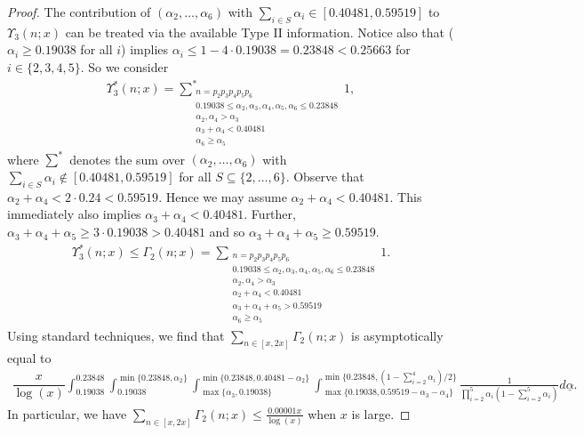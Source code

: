 \documentclass{amsart}
\numberwithin{equation}{section}
\begin{document}
\begin{proof}
\vspace{3mm} The contribution of $(\alpha_2,\dots, \alpha_6)$ with $\sum_{i \in S} \alpha_i \in [0.40481,0.59519]$ to $\Upsilon_3(n;x)$ can be treated via the available Type II information. Notice also that ($\alpha_i \geq 0.19038$ for all $i$)  implies $\alpha_i \leq 1- 4 \cdot 0.19038= 0.23848  < 0.25663$ for $i \in \{2,3,4,5\}$. So we consider 
\begin{align*}
\Upsilon_3^*(n;x) = \sum^*_{\substack{ n = p_2p_3p_4p_5p_6 \\ 0.19038 \leq \alpha_2, \alpha_3, \alpha_4, \alpha_5, \alpha_6 \leq 0.23848  \\ \alpha_2, \alpha_4 > \alpha_3  \\ \alpha_3+\alpha_4 < 0.40481 \\   \alpha_6 \geq \alpha_5 }} 1,
\end{align*}
where $\sum^*$ denotes the sum over $(\alpha_2,\dots, \alpha_6)$ with $\sum_{i \in S} \alpha_i \not\in [0.40481,0.59519]$ for all $S \subseteq \{2, \dots, 6\}$. 
Observe that $\alpha_2 + \alpha_4 < 2 \cdot 0.24 < 0.59519$. Hence we may assume $\alpha_2+\alpha_4 < 0.40481$. This immediately also implies $\alpha_3+\alpha_4 < 0.40481$. Further, $\alpha_3+\alpha_4+\alpha_5 \geq 3 \cdot 0.19038 >0.40481$ and so $\alpha_3+\alpha_4+\alpha_5 \geq 0.59519$. 
\begin{align*}
\Upsilon_3^*(n;x) \leq \Gamma_2(n;x) =  \sum_{\substack{ n = p_2p_3p_4p_5p_6 \\ 0.19038 \leq \alpha_2, \alpha_3, \alpha_4, \alpha_5, \alpha_6 \leq 0.23848  \\ \alpha_2, \alpha_4 > \alpha_3  \\ \alpha_2+\alpha_4 < 0.40481\\ \alpha_3 + \alpha_4 + \alpha_5 >0.59519 \\   \alpha_6 \geq \alpha_5 }} 1.
\end{align*}
Using standard techniques, we find that $\sum_{ n \in[x,2x]}\Gamma_2(n;x)$ is asymptotically equal to 
\begin{align*}
\dfrac{x}{\log(x)}\!\!\int^{0.23848 }_{0.19038}\int^{\min\{0.23848 , \alpha_2\}}_{0.19038}\!\!\!\!\int_{\max\{\alpha_3, 0.19038\}}^{\min\{0.23848 , 0.40481-\alpha_2\}}\!\!\!\!\int^{\min\{0.23848 ,(1-\sum_{i=2}^4\alpha_i)/2\}}_{\max\{0.19038, 0.59519-\alpha_3-\alpha_4\}} \frac{1}{\prod_{i=2}^5\alpha_i(1-\sum_{i=2}^5\alpha_i)} d\underline{\alpha}.
\end{align*} 
In particular, we have $\sum_{n \in [x,2x]} \Gamma_2(n;x) \leq \frac{0.00001x}{\log(x)}$ when $x$ is large. 
\end{proof}
\end{document}
